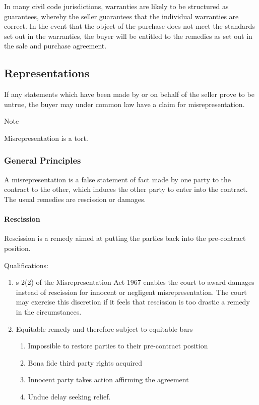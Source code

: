 \documentclass[
]{article}
\providecommand{\tightlist}{%
  \setlength{\itemsep}{0pt}\setlength{\parskip}{0pt}}
\newenvironment{env-48e9bfc8-c3dd-4504-a5fa-3b34b9a27ccf}
{
    \savenotes\tcolorbox[blanker,breakable,left=5pt,borderline west={2pt}{-4pt}{blue}]
}
{
    \endtcolorbox\spewnotes
}
\begin{document}
In many civil code jurisdictions, warranties are likely to be structured
as guarantees, whereby the seller guarantees that the individual
warranties are correct. In the event that the object of the purchase
does not meet the standards set out in the warranties, the buyer will be
entitled to the remedies as set out in the sale and purchase agreement.

\hypertarget{representations}{%
\subsection{Representations}\label{representations}}

If any statements which have been made by or on behalf of the seller
prove to be untrue, the buyer may under common law have a claim for
misrepresentation.

\begin{env-48e9bfc8-c3dd-4504-a5fa-3b34b9a27ccf}

Note

Misrepresentation is a tort.

\end{env-48e9bfc8-c3dd-4504-a5fa-3b34b9a27ccf}

\hypertarget{general-principles-1}{%
\subsubsection{General Principles}\label{general-principles-1}}

A misrepresentation is a false statement of fact made by one party to
the contract to the other, which induces the other party to enter into
the contract. The usual remedies are rescission or damages.

\hypertarget{rescission}{%
\paragraph{Rescission}\label{rescission}}

Rescission is a remedy aimed at putting the parties back into the
pre-contract position.

Qualifications:

\begin{enumerate}
\tightlist
\item
  s 2(2) of the Misrepresentation Act 1967 enables the court to award
  damages instead of rescission for innocent or negligent
  misrepresentation. The court may exercise this discretion if it feels
  that rescission is too drastic a remedy in the circumstances.
\item
  Equitable remedy and therefore subject to equitable bars

  \begin{enumerate}
  \tightlist
  \item
    Impossible to restore parties to their pre-contract position
  \item
    Bona fide third party rights acquired
  \item
    Innocent party takes action affirming the agreement
  \item
    Undue delay seeking relief.
  \end{enumerate}
\end{enumerate}
\end{document}

